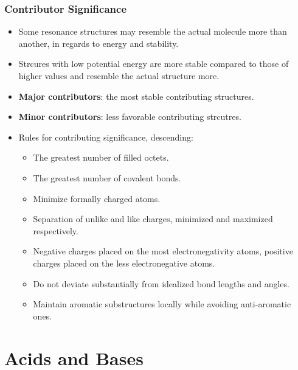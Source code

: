 \documentclass[12pt,a4paper]{article}
\begin{document}
\begin{itemize}
    \subsubsection{Contributor Significance}
    \begin{itemize}
        \item Some resonance structures may resemble the actual molecule more than another, in regards to energy and stability.
        \item Strcures with low potential energy are more stable compared to those of higher values and resemble the actual structure more.
        \item \textbf{Major contributors}: the most stable contributing structures.
        \item \textbf{Minor contributors}: less favorable contributing strcutres.
        \item Rules for contributing significance, descending:
            \begin{itemize}
                \item The greatest number of filled octets.
                \item The greatest number of covalent bonds.
                \item Minimize formally charged atoms.
                \item Separation of unlike and like charges, minimized and maximized respectively.
                \item Negative charges placed on the most electronegativity atoms, positive charges placed on the less electronegative atoms.
                \item Do not deviate substantially from idealized bond lengths and angles.
                \item Maintain aromatic substructures locally while avoiding anti-aromatic ones.
            \end{itemize}
    \end{itemize}
\end{itemize}

\clearpage
\section{Acids and Bases}
\end{document}
